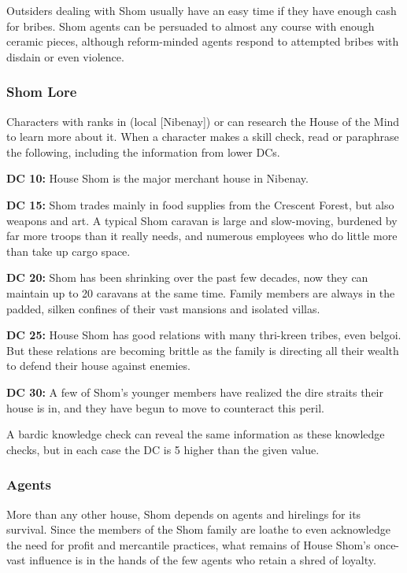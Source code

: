 Outsiders dealing with Shom usually have an easy time if they have enough cash for bribes. Shom agents can be persuaded to almost any course with enough ceramic pieces, although reform-minded agents respond to attempted bribes with disdain or even violence.

\subsubsection{Shom Lore}
Characters with ranks in  (local [Nibenay]) or  can research the House of the Mind to learn more about it. When a character makes a skill check, read or paraphrase the following, including the information from lower DCs.

\textbf{DC 10:} House Shom is the major merchant house in Nibenay.

\textbf{DC 15:} Shom trades mainly in food supplies from the Crescent Forest, but also weapons and art. A typical Shom caravan is large and slow-moving, burdened by far more troops than it really needs, and numerous employees who do little more than take up cargo space.

\textbf{DC 20:} Shom has been shrinking over the past few decades, now they can maintain up to 20 caravans at the same time. Family members are always in the padded, silken confines of their vast mansions and isolated villas.

\textbf{DC 25:} House Shom has good relations with many thri-kreen tribes, even belgoi. But these relations are becoming brittle as the family is directing all their wealth to defend their house against enemies.

\textbf{DC 30:} A few of Shom's younger members have realized the dire straits their house is in, and they have begun to move to counteract this peril.

A bardic knowledge check can reveal the same information as these knowledge checks, but in each case the DC is 5 higher than the given value.

\subsubsection{Agents}
More than any other house, Shom depends on agents and hirelings for its survival. Since the members of the Shom family are loathe to even acknowledge the need for profit and mercantile practices, what remains of House Shom's once-vast influence is in the hands of the few agents who retain a shred of loyalty.

